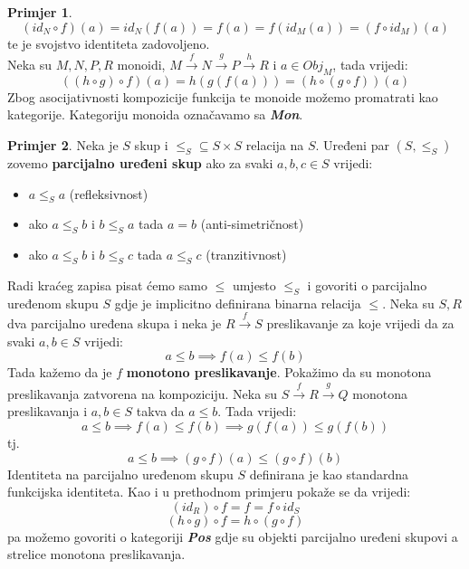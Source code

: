 \documentclass[11pt]{article}
\newcommand{\category}[1]{\textbf{\emph{#1}}}
\theoremstyle{definition}
\newtheorem{primjer}{Primjer}
\begin{document}
\begin{primjer}
\begin{equation*}
      (id_N \circ f)(a) = id_N(f(a)) = f(a) = f(id_M(a)) = (f \circ id_M)(a)
    \end{equation*}
    te je svojstvo identiteta zadovoljeno.\\
    Neka su $M, N, P, R$ monoidi, $M \xrightarrow{f} N \xrightarrow{g} P \xrightarrow{h} R$
    i $a \in Obj_M$, tada vrijedi:
    \begin{equation*}
      ((h \circ g) \circ f)(a) = h(g(f(a))) = (h \circ (g \circ f))(a)
    \end{equation*}
    Zbog asocijativnosti kompozicije funkcija te monoide možemo promatrati kao
    kategorije. Kategoriju monoida označavamo sa \category{Mon}.
  \end{primjer}

  \begin{primjer}
    Neka je $S$ skup i $\leq_S \subseteq S \times S$ relacija na $S$. Uređeni par $(S,
    \leq_S)$ zovemo \textbf{parcijalno uređeni skup} ako za svaki $a, b, c \in S$
    vrijedi:
    \begin{itemize}
      \item $a \leq_S a$ (refleksivnost)
      \item ako $a \leq_S b$ i $b \leq_S a$ tada $a = b$ (anti-simetričnost)
      \item ako $a \leq_S b$ i $b \leq_S c$ tada $a \leq_S c$ (tranzitivnost)
    \end{itemize}
    Radi kraćeg zapisa pisat ćemo samo $\leq$ umjesto $\leq_S$ i
  govoriti o parcijalno uređenom skupu $S$ gdje je implicitno definirana
  binarna relacija $\leq$.
  Neka su $S, R$ dva parcijalno uređena skupa i neka je $R \xrightarrow{f} S$
  preslikavanje za koje vrijedi da za svaki $a, b \in S$ vrijedi:
  \begin{equation*}
    a \leq b \implies f(a) \leq f(b)
  \end{equation*}
  Tada kažemo da je $f$ \textbf{monotono preslikavanje}.
  Pokažimo da su monotona preslikavanja zatvorena na kompoziciju.
  Neka su $S \xrightarrow{f} R \xrightarrow{g} Q$ monotona preslikavanja i $a,
  b \in S$ takva da $a \leq b$. Tada vrijedi:
  \begin{equation*}
    a \leq b \implies f(a) \leq f(b) \implies g(f(a)) \leq g(f(b))
  \end{equation*}
  tj.
  \begin{equation*}
    a \leq b \implies (g \circ f)(a) \leq (g \circ f)(b)
  \end{equation*}
  Identiteta na parcijalno uređenom skupu $S$ definirana je kao standardna
  funkcijska identiteta. Kao i u prethodnom primjeru pokaže se da vrijedi:
  \begin{equation*}
    (id_R) \circ f = f = f \circ id_S
  \end{equation*}
  \begin{equation*}
    (h \circ g) \circ f = h \circ (g \circ f)
  \end{equation*}
  pa možemo govoriti o kategoriji \category{Pos} gdje su objekti parcijalno
  uređeni skupovi a strelice monotona preslikavanja.
  \end{primjer}
\end{document}
